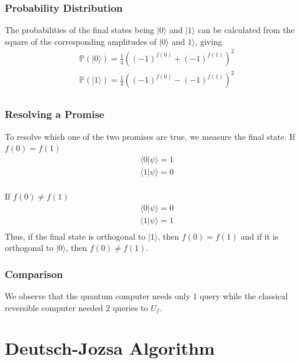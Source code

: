 \documentclass{article}
\begin{document}
    \subsubsection{Probability Distribution}
    The probabilities of the final states being $|0\rangle$ and $|1\rangle$ can be calculated from the square of the corresponding amplitudes of $|0\rangle$ and $1\rangle$, giving
    \begin{align*}
        &\mathds{P}(|0\rangle) = \frac{1}{4} \left( (-1)^{f(0)} + (-1)^{f(1)} \right) ^2 \\
        &\mathds{P}(|1\rangle) = \frac{1}{4} \left( (-1)^{f(0)} - (-1)^{f(1)} \right) ^2 \\
    \end{align*}

    \subsubsection{Resolving a Promise}
    To resolve which one of the two promises are true, we measure the final state.
    If $f(0)=f(1)$
    \begin{align*}
        & \langle 0 | \psi \rangle = 1\\
        & \langle 1| \psi \rangle = 0\\
    \end{align*}

    If $f(0)\neq f(1)$
    \begin{align*}
        & \langle 0 | \psi \rangle = 0\\
        & \langle 1| \psi \rangle = 1\\
    \end{align*}
    Thus, if the final state is orthogonal to $|1\rangle$, then $f(0)=f(1)$ and if it is orthogonal to $|0\rangle$, then $f(0) \neq f(1)$. \\

    \subsubsection{Comparison}
    We observe that the quantum computer needs only $1$ query while the classical reversible computer needed $2$ queries to $U_f$. 

    \section{Deutsch-Jozsa Algorithm}
\end{document}
